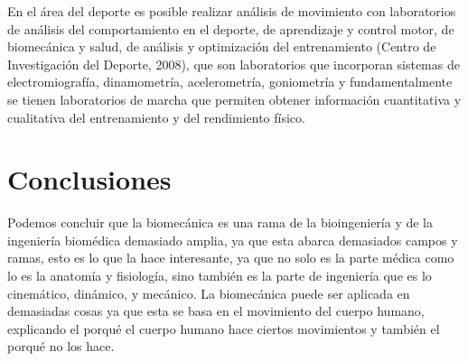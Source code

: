 \documentclass{article}
\begin{document}
En el área del deporte es posible realizar análisis de movimiento con laboratorios de análisis del comportamiento en el deporte, de aprendizaje y control motor, de biomecánica y salud, de análisis y optimización del entrenamiento (Centro de Investigación del Deporte, 2008), que son laboratorios que incorporan sistemas de electromiografía, dinamometría, acelerometría, goniometría y fundamentalmente se tienen laboratorios de marcha que permiten obtener información cuantitativa y cualitativa del entrenamiento y del rendimiento físico.\cite{4}


\section{Conclusiones}
Podemos concluir que la biomecánica es una rama de la bioingeniería y de la ingeniería biomédica demasiado amplia, ya que esta abarca demasiados campos y ramas, esto es lo que la hace interesante, ya que no solo es la parte médica como lo es la anatomía y fisiología, sino también es la parte de ingeniería que es lo cinemático, dinámico, y mecánico. La biomecánica puede ser aplicada en demasiadas cosas ya que esta se basa en el movimiento del cuerpo humano, explicando el porqué el cuerpo humano hace ciertos movimientos y también el porqué no los hace.




\end{document}
